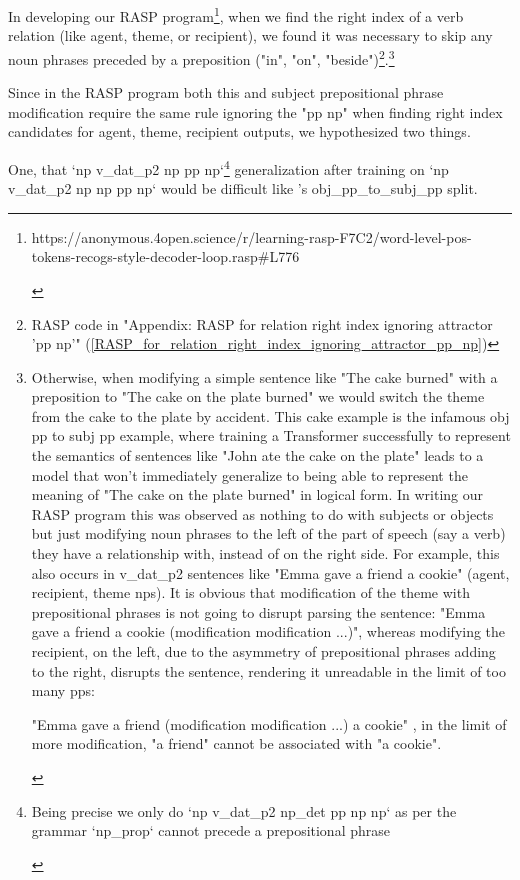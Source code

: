 \documentclass[11pt]{article}
\begin{document}
In developing our RASP program\footnote{\begin{footnotesize}https://anonymous.4open.science/r/learning-rasp-F7C2/word-level-pos-tokens-recogs-style-decoder-loop.rasp\#L776\end{footnotesize}},
when we find the right index of a verb relation (like agent, theme, or recipient), 
we found it was necessary to skip any noun phrases preceded by a preposition ("in", "on", "beside")\footnote{RASP code in "Appendix: RASP for relation right index ignoring attractor 'pp np'" (\ref{RASP_for_relation_right_index_ignoring_attractor_pp_np})}.\footnote{\begin{footnotesize}Otherwise, when modifying a simple sentence like "The cake burned" with a preposition to "The cake on the plate burned" we would switch the theme from the cake to the plate by accident.
This cake example is the infamous obj pp to subj pp example, where training a Transformer successfully to represent the semantics of sentences like "John ate the cake on the plate" leads to a model that won't immediately generalize to being able to represent the meaning of "The cake on the plate burned" in logical form.
In writing our RASP program this was observed as nothing to do with subjects or objects but just modifying noun phrases to the left of the part of speech (say a verb) they have a relationship with, instead of on the right side. For example, this also occurs in v\_dat\_p2 sentences like "Emma gave a friend a cookie" (agent, recipient, theme nps). It is obvious that modification of the theme with prepositional phrases is not going to disrupt parsing the sentence: "Emma gave a friend a cookie (modification modification ...)", whereas modifying the recipient, on the left, due to the asymmetry of prepositional phrases adding to the right, disrupts the sentence, rendering it unreadable in the limit of too many pps:

"Emma gave a friend (modification modification ...) a cookie" , in the limit of more modification, "a friend" cannot be associated with "a cookie".
\end{footnotesize}}

Since in the RASP program both this and subject prepositional phrase modification require the same rule ignoring the "pp np" when finding right index candidates for agent, theme, recipient outputs, we hypothesized two things.

One, that `np v\_dat\_p2 np pp np`\footnote{\begin{footnotesize}Being precise we only do `np v\_dat\_p2 np\_det pp np np` as per the grammar `np\_prop` cannot precede a prepositional phrase\end{footnotesize}} generalization after training on `np v\_dat\_p2 np np pp np` would be difficult like \cite{Wu2023}'s obj\_pp\_to\_subj\_pp split.
\end{document}
